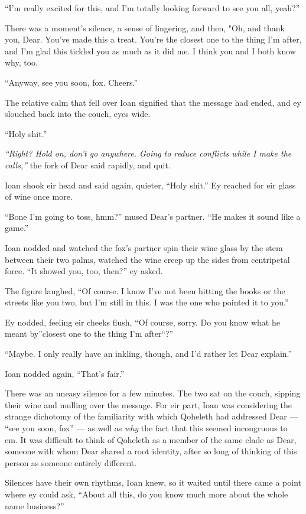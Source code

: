 ``I'm really excited for this, and I'm totally looking forward to see you all, yeah?''

There was a moment's silence, a sense of lingering, and then, "Oh, and thank you, Dear. You've made this a treat. You're the closest one to the thing I'm after, and I'm glad this tickled you as much as it did me. I think you and I both know why, too.

``Anyway, see you soon, fox. Cheers.''

The relative calm that fell over Ioan signified that the message had ended, and ey slouched back into the couch, eyes wide.

``Holy shit.''

\emph{``Right? Hold on, don't go anywhere. Going to reduce conflicts while I make the calls,''} the fork of Dear said rapidly, and quit.

Ioan shook eir head and said again, quieter, ``Holy shit.'' Ey reached for eir glass of wine once more.

``Bone I'm going to toss, hmm?'' mused Dear's partner. ``He makes it sound like a game.''

Ioan nodded and watched the fox's partner spin their wine glass by the stem between their two palms, watched the wine creep up the sides from centripetal force. ``It showed you, too, then?'' ey asked.

The figure laughed, ``Of course. I know I've not been hitting the books or the streets like you two, but I'm still in this. I was the one who pointed it to you.''

Ey nodded, feeling eir cheeks flush, ``Of course, sorry. Do you know what he meant by''closest one to the thing I'm after``?''

``Maybe. I only really have an inkling, though, and I'd rather let Dear explain.''

Ioan nodded again, ``That's fair.''

There was an uneasy silence for a few minutes. The two sat on the couch, sipping their wine and mulling over the message. For eir part, Ioan was considering the strange dichotomy of the familiarity with which Qoheleth had addressed Dear --- ``see you soon, fox'' --- as well as \emph{why} the fact that this seemed incongruous to em. It was difficult to think of Qoheleth as a member of the same clade as Dear, someone with whom Dear shared a root identity, after so long of thinking of this person as someone entirely different.

Silences have their own rhythms, Ioan knew, so it waited until there came a point where ey could ask, ``About all this, do you know much more about the whole name business?''

